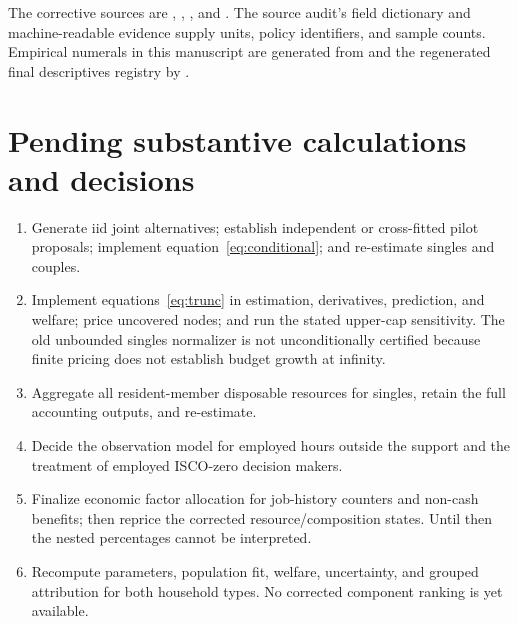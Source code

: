 \documentclass[11pt,a4paper]{article}
\begin{document}
The corrective sources are
,
,
, and
. The source audit's
field dictionary and machine-readable evidence supply units, policy identifiers,
and sample counts. Empirical numerals in this manuscript are generated from
 and the regenerated final
descriptives registry by .

\section{Pending substantive calculations and decisions}

\begin{enumerate}
\item Generate iid joint alternatives; establish independent or cross-fitted
pilot proposals; implement equation~\eqref{eq:conditional}; and re-estimate
singles and couples.
\item Implement equations~\eqref{eq:trunc} in estimation, derivatives,
prediction, and welfare; price uncovered nodes; and run the stated upper-cap
sensitivity. The old unbounded singles normalizer is not unconditionally
certified because finite pricing does not establish budget growth at infinity.
\item Aggregate all resident-member disposable resources for singles, retain
the full accounting outputs, and re-estimate.
\item Decide the observation model for employed hours outside the support and
the treatment of employed ISCO-zero decision makers.
\item Finalize economic factor allocation for job-history counters and non-cash
benefits; then reprice the corrected resource/composition states. Until then the
nested percentages cannot be interpreted.
\item Recompute parameters, population fit, welfare, uncertainty, and grouped
attribution for both household types. No corrected component ranking is yet
available.
\end{enumerate}



\end{document}
